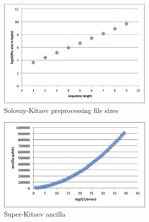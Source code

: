 \begin{center}
\begin{figure}[h!]
\label{fig:generation}
\includegraphics[width=3in]{normal-generation.eps}
\caption{Solovay-Kitaev preprocessing file sizes}
\end{figure}
\end{center}

\begin{center}
\begin{figure}[h!]
\label{fig:ancilla}
\includegraphics[width=3in]{super-ancilla.eps}
\caption{Super-Kitaev ancilla}
\end{figure}
\end{center}
